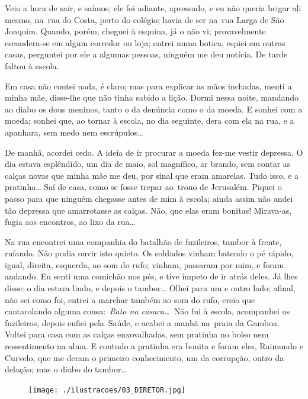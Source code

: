 Veio a hora de sair, e saímos; ele foi adiante, apressado, e eu não
queria brigar ali mesmo, na~rua do Costa, perto do colégio; havia de ser
na~rua Larga de São Joaquim. Quando, porém, cheguei à esquina, já o não
vi; provavelmente escondera-se em algum corredor ou loja; entrei numa
botica, espiei em outras casas, perguntei por ele a algumas pessoas,
ninguém me deu notícia. De tarde faltou à escola.

Em casa não contei nada, é claro; mas para explicar as mãos inchadas,
menti a minha mãe, disse-lhe que não tinha sabido a lição. Dormi nessa
noite, mandando ao diabo os dous meninos, tanto o da denúncia como o da
moeda. E sonhei com a moeda; sonhei que, ao tornar à escola, no dia
seguinte, dera com ela na rua, e a apanhara, sem medo nem escrúpulos\ldots{}

De manhã, acordei cedo. A ideia de ir procurar a moeda fez-me vestir
depressa. O dia estava esplêndido, um dia de maio, sol magnífico, ar
brando, sem contar as calças novas que minha mãe me deu, por sinal que
eram amarelas. Tudo isso, e a pratinha\ldots{} Saí de casa, como se fosse
trepar ao~trono de Jerusalém. Piquei o passo para que ninguém chegasse
antes de mim à escola; ainda assim não andei tão depressa que
amarrotasse as calças. Não, que elas eram bonitas! Mirava-as, fugia aos
encontros, ao lixo da rua\ldots{}

Na rua encontrei uma companhia do batalhão de fuzileiros, tambor à
frente, rufando. Não podia ouvir isto quieto. Os soldados vinham batendo
o pé rápido, igual, direita, esquerda, ao som do rufo; vinham, passaram
por mim, e foram andando. Eu senti uma comichão nos pés, e tive ímpeto
de ir atrás deles. Já lhes disse: o dia estava lindo, e depois o
tambor\ldots{} Olhei para um e outro lado; afinal, não sei como foi, entrei a
marchar também ao som do rufo, creio que cantarolando alguma
cousa:~\emph{Rato na casaca\ldots{}}~Não fui à escola, acompanhei os
fuzileiros, depois enfiei pela~Saúde, e acabei a manhã na~praia da
Gamboa. Voltei para casa com as calças enxovalhadas, sem pratinha no
bolso nem ressentimento na alma. E contudo a pratinha era bonita e foram
eles, Raimundo e Curvelo, que me deram o primeiro conhecimento, um da
corrupção, outro da delação; mas o diabo do tambor\ldots{}

\pagebreak
\thispagestyle{empty}
\begin{figure}
\texttt{[image: ./ilustracoes/03\_DIRETOR.jpg]}
\end{figure}
\pagebreak

